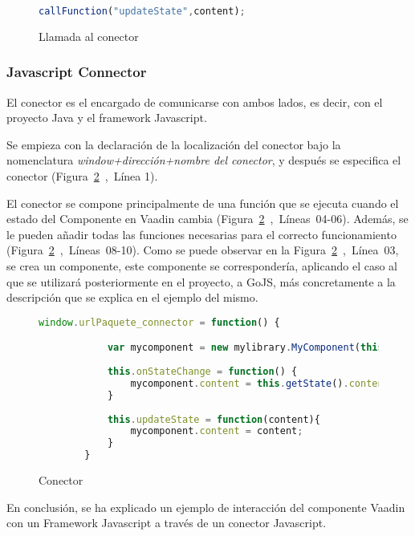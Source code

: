 \begin{figure}[!tb]
	\centering
	\begin{lstlisting}[language=JavaScript]
	callFunction("updateState",content);
	\end{lstlisting}
	\caption{Llamada al conector}
	\label{fig:callfunction}
\end{figure}
 			
 			
 			
 	\subsubsection{Javascript Connector}	
 	
 	
 	El conector es el encargado de comunicarse con ambos lados, es decir, con el proyecto Java y el framework Javascript.
 	
 	Se empieza con la declaración de la localización del conector bajo la nomenclatura \emph{window+dirección+nombre del conector}, y después se especifica el conector (Figura~\ref{fig:conectorDesc}~,~Línea 1).
 	
 	El conector se compone principalmente de una función que se ejecuta cuando el estado del Componente en Vaadin cambia (Figura~\ref{fig:conectorDesc}~,~Líneas~04-06). Además, se le pueden añadir todas las funciones necesarias para el correcto funcionamiento (Figura~\ref{fig:conectorDesc}~,~Líneas~08-10). Como se puede observar en la Figura~\ref{fig:conectorDesc}~,~Línea~03, se crea un componente, este componente se correspondería, aplicando el caso al que se utilizará posteriormente en el proyecto, a GoJS, más concretamente a la descripción que se explica en el ejemplo del mismo.
 	
 	
 	\begin{figure}[!tb]
 		\centering
 		\begin{lstlisting}[language=JavaScript]
 		window.urlPaquete_connector = function() {

 			var mycomponent = new mylibrary.MyComponent(this.getElement());
		 	
		 	this.onStateChange = function() {
		 		mycomponent.content = this.getState().content; 
		 	}
		 	
		 	this.updateState = function(content){
		 		mycomponent.content = content;
		 	}
	 	}
 		\end{lstlisting}
 		\caption{Conector}
 		\label{fig:conectorDesc}
 	\end{figure}

	En conclusión, se ha explicado un ejemplo de interacción del componente Vaadin con un Framework Javascript a través de un conector Javascript.
 	
 	
 	
 			